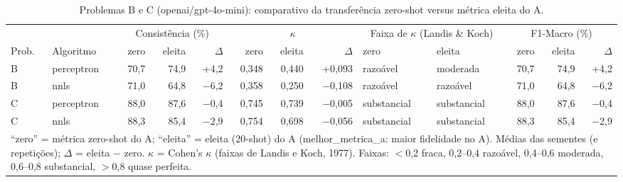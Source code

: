 \begin{table}[htbp]
\centering
\footnotesize
\caption{Problemas B e C (openai/gpt-4o-mini): comparativo da transferência zero-shot versus métrica eleita do A.}
\label{tab:T9_comp_gpt4mini}
\begin{tabular}{llrrrrrrllrrr}
\toprule
 &  & \multicolumn{3}{c}{Consistência (\%)} & \multicolumn{3}{c}{$\kappa$} & \multicolumn{2}{c}{Faixa de $\kappa$ (Landis \& Koch)} & \multicolumn{3}{c}{F1-Macro (\%)} \\ \cmidrule(lr){3-5} \cmidrule(lr){6-8} \cmidrule(lr){9-10} \cmidrule(lr){11-13}
Prob. & Algoritmo & zero & eleita & $\Delta$ & zero & eleita & $\Delta$ & zero & eleita & zero & eleita & $\Delta$ \\
\midrule
B & perceptron & 70,7 & 74,9 & +4,2 & 0,348 & 0,440 & +0,093 & razoável & moderada & 70,7 & 74,9 & +4,2 \\
B & nnls & 71,0 & 64,8 & $-$6,2 & 0,358 & 0,250 & $-$0,108 & razoável & razoável & 71,0 & 64,8 & $-$6,2 \\
\midrule
C & perceptron & 88,0 & 87,6 & $-$0,4 & 0,745 & 0,739 & $-$0,005 & substancial & substancial & 88,0 & 87,6 & $-$0,4 \\
C & nnls & 88,3 & 85,4 & $-$2,9 & 0,754 & 0,698 & $-$0,056 & substancial & substancial & 88,3 & 85,4 & $-$2,9 \\
\bottomrule
\multicolumn{13}{p{0.95\linewidth}}{\footnotesize ``zero'' = métrica zero-shot do A; ``eleita'' = eleita (20-shot) do A (melhor\_metrica\_a: maior fidelidade no A). Médias das sementes (e repetições); $\Delta$ = eleita $-$ zero. $\kappa$ = Cohen's $\kappa$ (faixas de Landis e Koch, 1977). Faixas: $<$0,2 fraca, 0,2–0,4 razoável, 0,4–0,6 moderada, 0,6–0,8 substancial, $>$0,8 quase perfeita.} \\
\end{tabular}
\end{table}
